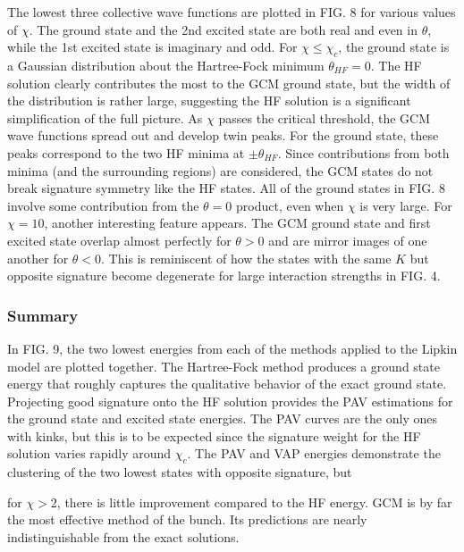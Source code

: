 \documentclass[prb,aps,twocolumn,showpacs,10pt]{revtex4-2}
\begin{document}
The lowest three collective wave functions are plotted in FIG. 8 for various values of $\chi$. The ground state and the 2nd excited state are both real and even in $\theta$, while the 1st excited state is imaginary and odd. For $\chi \leq \chi_c$, the ground state is a Gaussian distribution about the Hartree-Fock minimum $\theta_{HF} = 0$. The HF solution clearly contributes the most to the GCM ground state, but the width of the distribution is rather large, suggesting the HF solution is a significant simplification of the full picture. As $\chi$ passes the critical threshold, the GCM wave functions spread out and develop twin peaks. For the ground state, these peaks correspond to the two HF minima at $\pm \theta_{HF}$. Since contributions from both minima (and the surrounding regions) are considered, the GCM states do not break signature symmetry like the HF states. All of the ground states in FIG. 8 involve some contribution from the $\theta=0$ product, even when $\chi$ is very large. For $\chi = 10$, another interesting feature appears. The GCM ground state and first excited state overlap almost perfectly for $\theta>0$ and are mirror images of one another for $\theta<0$. This is reminiscent of how the states with the same $K$ but opposite signature become degenerate for large interaction strengths in FIG. 4.

\subsubsection{Summary}

In FIG. 9, the two lowest energies from each of the methods applied to the Lipkin model are plotted together. The Hartree-Fock method produces a ground state energy that roughly captures the qualitative behavior of the exact ground state. Projecting good signature onto the HF solution provides the PAV estimations for the ground state and excited state energies. The PAV curves are the only ones with kinks, but this is to be expected since the signature weight for the HF solution varies rapidly around $\chi_c$. The PAV and VAP energies demonstrate the clustering of the two lowest states with opposite signature, but 

for $\chi>2$, there is little improvement compared to the HF energy. GCM is by far the most effective method of the bunch. Its predictions are nearly indistinguishable from the exact solutions. 
\end{document}
